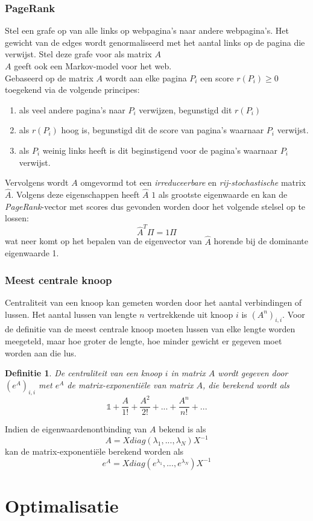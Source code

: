 \documentclass{article}
\newtheorem{mydef}{Definitie}
\begin{document}
	\subsubsection{PageRank}
	
	Stel een grafe op van alle links op webpagina's naar andere webpagina's. Het gewicht van de edges wordt genormaliseerd met het aantal links op de pagina die verwijst. Stel deze grafe voor als matrix $A$\\
	
	$A$ geeft ook een Markov-model voor het web.\\
	
	Gebaseerd op de matrix $A$ wordt aan elke pagina $P_i$ een score $r(P_i) \geq 0$ toegekend via de volgende principes:
	\begin{enumerate}
		\item als veel andere pagina's naar $P_i$ verwijzen, begunstigd dit $r(P_i)$
		\item als $r(P_i)$ hoog is, begunstigd dit de score van pagina's waarnaar $P_i$ verwijst.
		\item als $P_i$ weinig links heeft is dit beginstigend voor de pagina's waarnaar $P_i$ verwijst.
	\end{enumerate}

	Vervolgens wordt $A$ omgevormd tot een \textit{irreduceerbare} en \textit{rij-stochastische} matrix $\hat{A}$. Volgens deze eigenschappen heeft $\hat{A}$ $1$ als grootste eigenwaarde en kan de \textit{PageRank}-vector met scores dus gevonden worden door het volgende stelsel op te lossen:
	$$ \hat{A}^T \Pi = 1 \Pi $$
	wat neer komt op het bepalen van de eigenvector van $\hat{A}$ horende bij de dominante eigenwaarde 1.
	
	\subsubsection{Meest centrale knoop}
	
	Centraliteit van een knoop kan gemeten worden door het aantal verbindingen of lussen. Het aantal lussen van lengte $n$ vertrekkende uit knoop $i$ is $(A^n)_{i,i}$. Voor de definitie van de meest centrale knoop moeten lussen van elke lengte worden meegeteld, maar hoe groter de lengte, hoe minder gewicht er gegeven moet worden aan die lus.\\
	
	\begin{mydef}
		
		De centraliteit van een knoop $i$ in matrix $A$ wordt gegeven door $(e^A)_{i,i}$ met $e^A$ de matrix-exponentiële van matrix $A$, die berekend wordt als
		$$
		\mathbb{1} + \frac{A}{1!} + \frac{A^2}{2!} + ... + \frac{A^n}{n!} + ...
		$$
	\end{mydef}
	
	Indien de eigenwaardenontbinding van $A$ bekend is als
	$$
	 A = X diag(\lambda_1, ... , \lambda_N) X^{-1}
	$$
	kan de matrix-exponentiële berekend worden als
	$$
		e^A = X diag(e^{\lambda_1}, ... , e^{\lambda_N}) X^{-1}
	$$
	
	\section{Optimalisatie}
	
	
	
\end{document}
